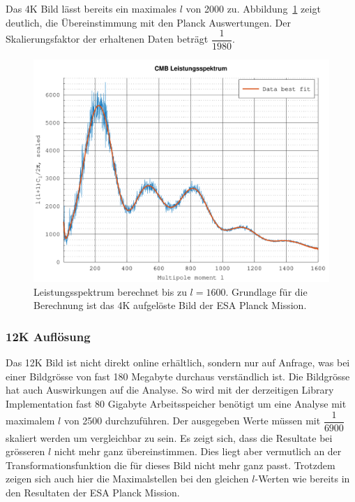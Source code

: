 Das 4K Bild lässt bereits ein maximales $l$ von 2000 zu. 
Abbildung~\ref{fig:cmb-power-spec-1600} zeigt deutlich, die Übereinstimmung mit 
den Planck Auswertungen. Der Skalierungsfaktor der erhaltenen Daten beträgt 
$\dfrac{1}{1980}$.

\begin{figure}
	\centering
	\includegraphics[width=\linewidth]{cmb/data/4k1800-500.pdf}
	\caption{Leistungsspektrum berechnet bis zu $l = 1600$. Grundlage für die 
		Berechnung ist das 4K aufgelöste Bild der ESA Planck Mission.}
	\label{fig:cmb-power-spec-1600}
\end{figure}

\subsubsection{12K Auflösung}

Das 12K Bild ist nicht direkt online erhältlich, sondern nur auf Anfrage, was 
bei einer Bildgrösse von fast 180 Megabyte durchaus verständlich ist. Die 
Bildgrösse hat auch Auswirkungen auf die Analyse. So wird mit der derzeitigen 
Library Implementation fast 80 Gigabyte Arbeitsspeicher benötigt um eine 
Analyse mit maximalem $l$ von 2500 durchzuführen. Der ausgegeben Werte müssen 
mit $\dfrac{1}{6900}$ skaliert werden um vergleichbar zu sein. Es zeigt sich, 
dass die Resultate bei grösseren $l$ nicht mehr ganz übereinstimmen. Dies liegt 
aber vermutlich an der Transformationsfunktion die für dieses Bild nicht mehr 
ganz passt. Trotzdem zeigen sich auch hier die Maximalstellen bei den gleichen 
$l$-Werten wie bereits in den Resultaten der ESA Planck Mission.

